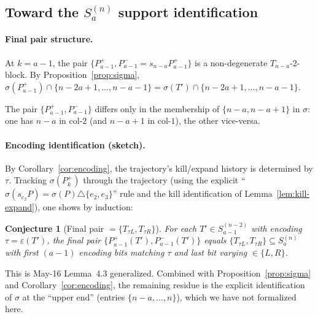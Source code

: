 \documentclass[11pt]{article}
\newtheorem{conjecture}[theorem]{Conjecture}
\theoremstyle{definition}
\begin{document}
\subsection{Toward the $S_a^{(n)}$ support identification}\label{sec:remaining}

\paragraph{Final pair structure.}  At $k=a-1$, the pair
$\{P_{a-1}^+,P_{a-1}^-=s_{n-a}P_{a-1}^+\}$ is a non-degenerate
$T_{n-a}$-2-block.  By Proposition~\ref{prop:sigma},
$\sigma(P_{a-1}^+)\cap\{n-2a+1,\ldots,n-a-1\}=
\sigma(T')\cap\{n-2a+1,\ldots,n-a-1\}$.

The pair $\{P_{a-1}^+,P_{a-1}^-\}$ differs only in the membership of
$\{n-a,n-a+1\}$ in $\sigma$: one has $n-a$ in col-$2$ (and
$n-a+1$ in col-$1$), the other vice-versa.

\paragraph{Encoding identification (sketch).}  By
Corollary~\ref{cor:encoding}, the trajectory's kill/expand history is
determined by $\tau$.  Tracking $\sigma(P_k^+)$ through the
trajectory (using the explicit ``$\sigma(s_{e_2}P)=\sigma(P)
\triangle\{e_2,e_3\}$'' rule and the kill identification of
Lemma~\ref{lem:kill-expand}), one shows by induction:

\begin{conjecture}[Final pair $=\{T_{\tau L},T_{\tau R}\}$]\label{conj:final-pair}
For each $T'\in S_{a-1}^{(n-2)}$ with encoding $\tau=\varepsilon(T')$,
the final pair $\{P_{a-1}^+(T'),P_{a-1}^-(T')\}$ equals
$\{T_{\tau L},T_{\tau R}\}\subseteq S_a^{(n)}$ with first $(a-1)$
encoding bits matching $\tau$ and last bit varying $\in\{L,R\}$.
\end{conjecture}

This is May-16 Lemma~4.3 generalized.  Combined with
Proposition~\ref{prop:sigma} and Corollary~\ref{cor:encoding}, the
remaining residue is the explicit identification of $\sigma$ at the
``upper end'' (entries $\{n-a,\ldots,n\}$), which we have not
formalized here.
\end{document}
